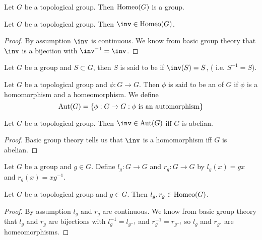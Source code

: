 \documentclass{book}
\begin{document}
	\begin{note}
	Let $G$ be a topological group. Then $\operatorname{Homeo}(G)$ is a group.
	\end{note}
	
	\begin{ex}  
		Let $G$ be a topological group. Then $\inv \in \Homeo(G)$.
	\end{ex}

	\begin{proof}
		By assumption $\inv$ is continuous. We know from basic group theory that $\inv$ is a bijection with $\inv^{-1} = \inv$. 
	\end{proof}

	\begin{defn}  
		Let $G$ be a group and $S \subset G$, then $S$ is said to be  if $\inv(S) = S$, ( i.e. $S^{-1} = S$).
	\end{defn}
	
	\begin{defn}  
		Let $G$ be a topological group and $\phi:G \rightarrow G$. Then $\phi$ is said to be an  of $G$ if $\phi$ is a homomorphism and a homeomorphism. We define $$\operatorname{Aut}(G) = \{\phi:G \rightarrow G: \phi \text{ is an automorphism}\}$$
	\end{defn}
	
	\begin{ex}  
	Let $G$ be a topological group. Then $\inv \in \Aut(G)$ iff $G$ is abelian. 
	\end{ex}
	
	\begin{proof}
	Basic group theory tells us that $\inv$ is a homomorphism iff $G$ is abelian.
	\end{proof}
	
	\begin{defn}  
		Let $G$ be a group and $g \in G$. Define $l_g:G \rightarrow G$ and $r_g:G \rightarrow G$ by $l_g(x) = gx$ and $r_g(x) = xg^{-1}$. 
	\end{defn}
	
	\begin{ex}  
		Let $G$ be a topological group and $g \in G$. Then $l_g, r_g \in \operatorname{Homeo}(G)$.
	\end{ex}
	
	\begin{proof}
		By assumption $l_g$ and $r_g$ are continuous. We know from basic group theory that $l_g$ and $r_g$ are bijections with $l_g^{-1} = l_{g^{-1}}$ and $r_g^{-1} = r_{g^{-1}}$ so $l_g$ and $r_g$. are homeomorphisms. 
	\end{proof}
	
\end{document}

